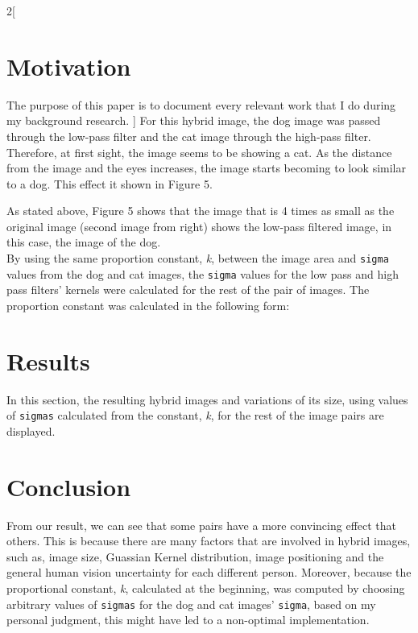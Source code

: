 \documentclass[a4paper]{article}
\newenvironment{Figure}
{\par\medskip\noindent\minipage{\linewidth}}
{\endminipage\par\medskip}
\begin{document}
\begin{multicols}{2}[
		\section*{Motivation}
		The purpose of this paper is to document every relevant work that I do during my background research.
		]
		For this hybrid image, the dog image was passed through the low-pass filter and the cat image through the high-pass filter. Therefore, at first sight, the image seems to be showing a cat. As the distance from the image and the eyes increases, the image starts becoming to look similar to a dog. This effect it shown in Figure 5. 

		
		As stated above, Figure 5 shows that the image that is 4 times as small as the original image (second image from right) shows the low-pass filtered image, in this case, the image of the dog. \\
		By using the same proportion constant, \textit{k}, between the image area and \texttt{sigma} values from the dog and cat images, the \texttt{sigma} values for the low pass and high pass filters' kernels were calculated for the rest of the pair of images. The proportion constant was calculated in the following form:
		

		\section{Results}
		In this section, the resulting hybrid images and variations of its size, using values of \texttt{sigmas} calculated from the constant, \textit{k}, for the rest of the image pairs are displayed.
		

	
		

		\section{Conclusion}
		From our result, we can see that some pairs have a more convincing effect that others. This is because there are many factors that are involved in hybrid images, such as, image size, Guassian Kernel distribution, image positioning and the general human vision uncertainty for each different person. Moreover, because the proportional constant, \textit{k}, calculated at the beginning, was computed by choosing arbitrary values of \texttt{sigmas} for the dog and cat images' \texttt{sigma}, based on my personal judgment, this might have led to a non-optimal implementation.
		
	\end{multicols}
\end{document}
